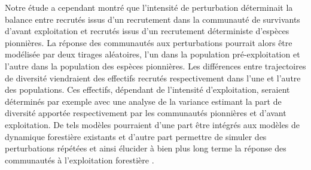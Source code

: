 \documentclass[
  11pt,
  french,
  A4paper,
  extrafontsizes,onecolumn,openright
  ]{memoir}
\begin{document}
Notre étude a cependant montré que l'intensité de perturbation
déterminait la balance entre recrutés issus d'un recrutement dans la
communauté de survivants d'avant exploitation et recrutés issus d'un
recrutement déterministe d'espèces pionnières. La réponse des
communautés aux perturbations pourrait alors être modélisée par deux
tirages aléatoires, l'un dans la population pré-exploitation et l'autre
dans la population des espèces pionnières. Les différences entre
trajectoires de diversité viendraient des effectifs recrutés
respectivement dans l'une et l'autre des populations. Ces effectifs,
dépendant de l'intensité d'exploitation, seraient déterminés par exemple
avec une analyse de la variance estimant la part de diversité apportée
respectivement par les communautés pionnières et d'avant exploitation.
De tels modèles pourraient d'une part être intégrés aux modèles de
dynamique forestière existants et d'autre part permettre de simuler des
perturbations répétées et ainsi élucider à bien plus long terme la
réponse des communautés à l'exploitation forestière
\autocite{Dufour2012}.



\backmatter
\SmallMargins

%
\printbibliography










\evenpage
\SmallMargins
\thispagestyle{empty}
\end{document}
